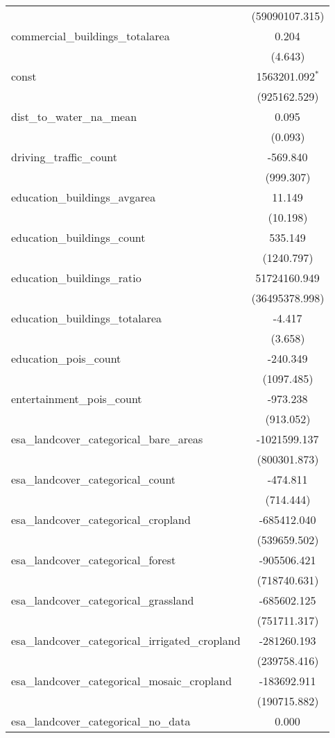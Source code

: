 \begin{table}[!htbp]
\begin{tabular}{@{\extracolsep{5pt}}lc}
  & (59090107.315) \\
 commercial_buildings_totalarea & 0.204$^{}$ \\
  & (4.643) \\
 const & 1563201.092$^{*}$ \\
  & (925162.529) \\
 dist_to_water_na_mean & 0.095$^{}$ \\
  & (0.093) \\
 driving_traffic_count & -569.840$^{}$ \\
  & (999.307) \\
 education_buildings_avgarea & 11.149$^{}$ \\
  & (10.198) \\
 education_buildings_count & 535.149$^{}$ \\
  & (1240.797) \\
 education_buildings_ratio & 51724160.949$^{}$ \\
  & (36495378.998) \\
 education_buildings_totalarea & -4.417$^{}$ \\
  & (3.658) \\
 education_pois_count & -240.349$^{}$ \\
  & (1097.485) \\
 entertainment_pois_count & -973.238$^{}$ \\
  & (913.052) \\
 esa_landcover_categorical_bare_areas & -1021599.137$^{}$ \\
  & (800301.873) \\
 esa_landcover_categorical_count & -474.811$^{}$ \\
  & (714.444) \\
 esa_landcover_categorical_cropland & -685412.040$^{}$ \\
  & (539659.502) \\
 esa_landcover_categorical_forest & -905506.421$^{}$ \\
  & (718740.631) \\
 esa_landcover_categorical_grassland & -685602.125$^{}$ \\
  & (751711.317) \\
 esa_landcover_categorical_irrigated_cropland & -281260.193$^{}$ \\
  & (239758.416) \\
 esa_landcover_categorical_mosaic_cropland & -183692.911$^{}$ \\
  & (190715.882) \\
 esa_landcover_categorical_no_data & 0.000$^{}$ \\

\end{tabular}
\end{table}
